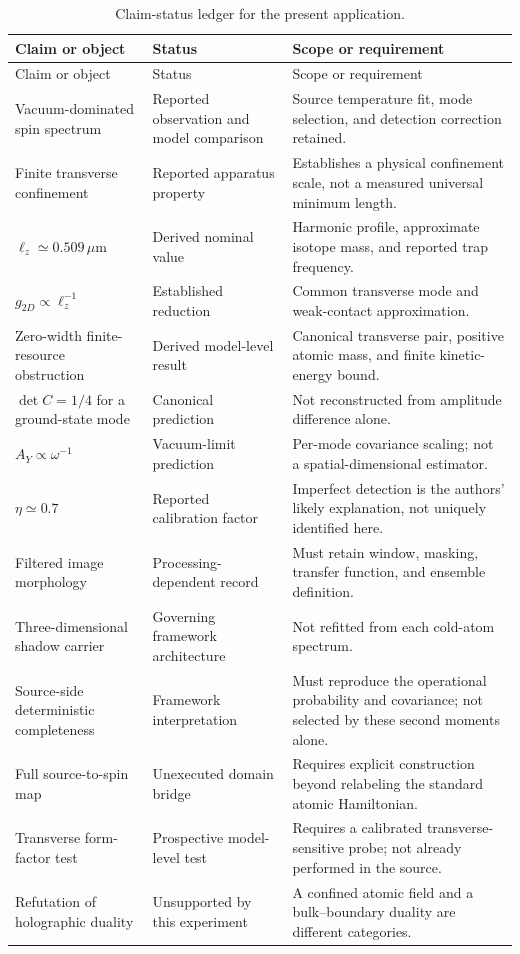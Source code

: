\documentclass[11pt,a4paper]{article}
\theoremstyle{definition}
\theoremstyle{remark}
\newcommand{\lop}{\ell_z}
\begin{document}
\begin{longtable}{@{}L{0.25\textwidth}L{0.27\textwidth}L{0.40\textwidth}@{}}
\caption{Claim-status ledger for the present application.\label{tab:ledger}}\\
\toprule Claim or object & Status & Scope or requirement\\\midrule
\endfirsthead
\toprule Claim or object & Status & Scope or requirement\\\midrule
\endhead
\bottomrule\endfoot
Vacuum-dominated spin spectrum & Reported observation and model comparison & Source temperature fit, mode selection, and detection correction retained.\cite{zhang2026}\\
Finite transverse confinement & Reported apparatus property & Establishes a physical confinement scale, not a measured universal minimum length.\cite{zhang2026}\\
$\lop\simeq0.509\,\mu\mathrm m$ & Derived nominal value & Harmonic profile, approximate isotope mass, and reported trap frequency.\\
$g_{2D}\propto\lop^{-1}$ & Established reduction & Common transverse mode and weak-contact approximation.\cite{hadzibabic}\\
Zero-width finite-resource obstruction & Derived model-level result & Canonical transverse pair, positive atomic mass, and finite kinetic-energy bound.\\
$\det C=1/4$ for a ground-state mode & Canonical prediction & Not reconstructed from amplitude difference alone.\\
$A_Y\propto\omega^{-1}$ & Vacuum-limit prediction & Per-mode covariance scaling; not a spatial-dimensional estimator.\\
$\eta\simeq0.7$ & Reported calibration factor & Imperfect detection is the authors' likely explanation, not uniquely identified here.\cite{zhang2026}\\
Filtered image morphology & Processing-dependent record & Must retain window, masking, transfer function, and ensemble definition.\\
Three-dimensional shadow carrier & Governing framework architecture & Not refitted from each cold-atom spectrum.\cite{foundation}\\
Source-side deterministic completeness & Framework interpretation & Must reproduce the operational probability and covariance; not selected by these second moments alone.\cite{born}\\
Full source-to-spin map & Unexecuted domain bridge & Requires explicit construction beyond relabeling the standard atomic Hamiltonian.\\
Transverse form-factor test & Prospective model-level test & Requires a calibrated transverse-sensitive probe; not already performed in the source.\\
Refutation of holographic duality & Unsupported by this experiment & A confined atomic field and a bulk--boundary duality are different categories.\\
\end{longtable}
\end{document}
